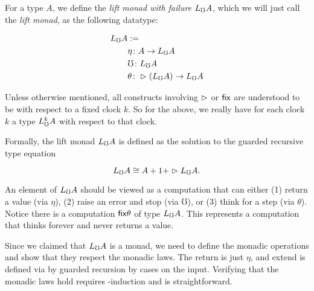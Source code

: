 For a type $A$, we define the \emph{lift monad with failure} $L_\mho A$, which we will just call
the \emph{lift monad}, as the following datatype:

\begin{align*}
  L_\mho A &:= \\
  &\eta \colon A \to L_\mho A \\
  &\mho \colon L_\mho A \\
  &\theta \colon \vartriangleright (L_\mho A) \to L_\mho A
\end{align*}

Unless otherwise mentioned, all constructs involving $\vartriangleright$ or $\mathsf{fix}$
are understood to be with respect to a fixed clock $k$. So for the above, we really have for each
clock $k$ a type $L_\mho^k A$ with respect to that clock.

Formally, the lift monad $L_\mho A$ is defined as the solution to the guarded recursive type equation

\[ L_\mho A \cong A + 1 + \vartriangleright L_\mho A. \]

An element of $L_\mho A$ should be viewed as a computation that can either (1) return a value (via $\eta$),
(2) raise an error and stop (via $\mho$), or (3) think for a step (via $\theta$).
%
Notice there is a computation $\mathsf{fix} \theta$ of type $L_\mho A$. This represents a computation
that thinks forever and never returns a value.

Since we claimed that $L_\mho A$ is a monad, we need to define the monadic operations
and show that they respect the monadic laws. The return is just $\eta$, and extend
is defined via by guarded recursion by cases on the input.
%
%
Verifying that the monadic laws hold requires \lob-induction and is straightforward.

